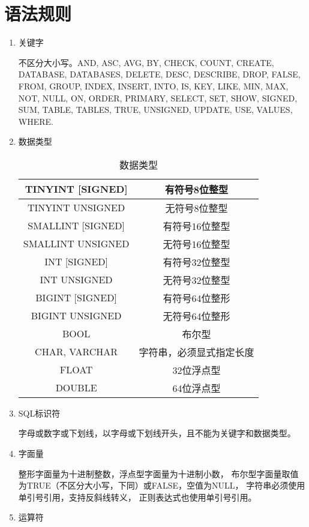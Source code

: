 \section{语法规则}
    \begin{enumerate}
    \item
    关键字

    不区分大小写。AND, ASC, AVG, BY, CHECK, COUNT, CREATE, DATABASE, DATABASES,
    DELETE, DESC, DESCRIBE, DROP, FALSE, FROM, GROUP, INDEX, INSERT, INTO,
    IS, KEY, LIKE, MIN, MAX, NOT, NULL, ON, ORDER, PRIMARY, SELECT, SET, SHOW,
    SIGNED, SUM, TABLE, TABLES, TRUE, UNSIGNED, UPDATE, USE, VALUES, WHERE.
    \item
    数据类型
    \begin{table}[!hbp]
        \centering
        \caption{数据类型}
        \begin{tabular}{|c|c|}
        \hline
        TINYINT [SIGNED] & 有符号8位整型 \\
        \hline
        TINYINT UNSIGNED & 无符号8位整型 \\
        \hline
        SMALLINT [SIGNED] & 有符号16位整型 \\
        \hline
        SMALLINT UNSIGNED & 无符号16位整型 \\
        \hline
        INT [SIGNED] & 有符号32位整型 \\
        \hline
        INT UNSIGNED & 无符号32位整型 \\
        \hline
        BIGINT [SIGNED] & 有符号64位整形 \\
        \hline
        BIGINT UNSIGNED & 无符号64位整形 \\
        \hline
        BOOL & 布尔型 \\
        \hline
        CHAR, VARCHAR & 字符串，必须显式指定长度 \\
        \hline
        FLOAT & 32位浮点型 \\
        \hline
        DOUBLE & 64位浮点型 \\
        \hline
        \end{tabular}
    \end{table}

    \item
    SQL标识符

    字母或数字或下划线，以字母或下划线开头，且不能为关键字和数据类型。
    \item
    字面量

    整形字面量为十进制整数，浮点型字面量为十进制小数，%
    布尔型字面量取值为TRUE（不区分大小写，下同）或FALSE，空值为NULL，%
    字符串必须使用单引号引用，支持反斜线转义，%
    正则表达式也使用单引号引用。
    \item
    运算符


\end{enumerate}
